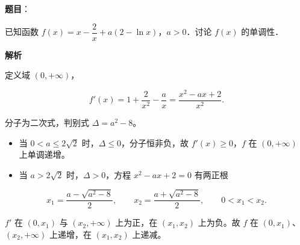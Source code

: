 \begin{answer}

\textbf{题目}：

已知函数 $f(x)=x-\dfrac2x+a(2-\ln x)$，$a>0$．讨论 $f(x)$ 的单调性．

\textbf{解析}

定义域 $(0,+\infty)$，

\nopagebreak[4]
\[f'(x)=1+\frac{2}{x^2}-\frac ax=\frac{x^2-ax+2}{x^2}.\]

分子为二次式，判别式 $\Delta=a^2-8$。

\begin{itemize}
\item 当 $0<a\leqslant2\sqrt2$ 时，$\Delta\leqslant0$，分子恒非负，故 $f'(x)\geqslant0$，$f$ 在 $(0,+\infty)$ 上单调递增。
\item 当 $a>2\sqrt2$ 时，$\Delta>0$，方程 $x^2-ax+2=0$ 有两正根
\end{itemize}

\nopagebreak[4]
\[x_1=\frac{a-\sqrt{a^2-8}}{2},\qquad x_2=\frac{a+\sqrt{a^2-8}}{2},\qquad 0<x_1<x_2 .\]

$f'$ 在 $(0,x_1)$ 与 $(x_2,+\infty)$ 上为正，在 $(x_1,x_2)$ 上为负。故 $f$ 在 $(0,x_1)$、$(x_2,+\infty)$ 上递增，在 $(x_1,x_2)$ 上递减。


\end{answer}
